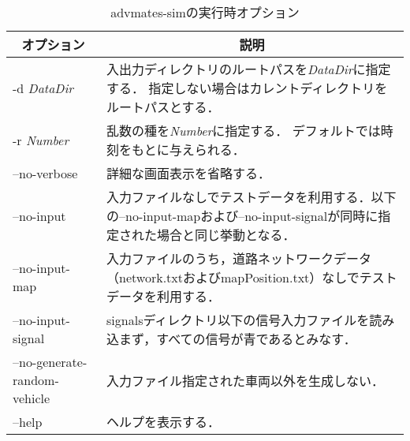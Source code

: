 \begin{table}[hbt]
  \caption{advmates-simの実行時オプション}
  \small
  \begin{center}
    \begin{tabular}{|l|p{20em}|} \hline
      \multicolumn{1}{|c|}{オプション}
      & \multicolumn{1}{|c|}{説明} \\ \hline\hline
      
      -d {\sl DataDir}
      & 入出力ディレクトリのルートパスを{\sl DataDir}に指定する．
      指定しない場合はカレントディレクトリをルートパスとする． \\ \hline
      
      -r {\sl Number}
      & 乱数の種を{\sl Number}に指定する．
      デフォルトでは時刻をもとに与えられる． \\ \hline
      
      --no-verbose
      & 詳細な画面表示を省略する．\\ \hline
      
      --no-input
      & 入力ファイルなしでテストデータを利用する．以下の--no-input-mapおよび--no-input-signalが同時に指定された場合と同じ挙動となる．\\ \hline
      
      --no-input-map
      & 入力ファイルのうち，道路ネットワークデータ（network.txtおよびmapPosition.txt）なしでテストデータを利用する．\\ \hline
      
      --no-input-signal
      & signalsディレクトリ以下の信号入力ファイルを読み込まず，すべての信号が青であるとみなす．\\ \hline
      
      --no-generate-random-vehicle
      & 入力ファイル指定された車両以外を生成しない．\\ \hline
      
      --help
      & ヘルプを表示する．\\ \hline
      
    \end{tabular}
  \end{center}
  \label{tbl:advsim-option}
\end{table}

